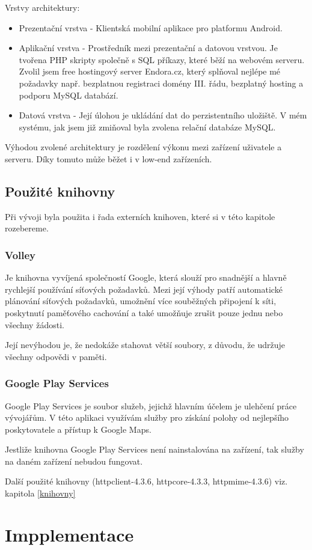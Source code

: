 \documentclass[12pt]{article}
\begin{document}
Vrstvy architektury:
\begin{itemize}
\item Prezentační vrstva - Klientská mobilní aplikace pro platformu Android.
\item Aplikační vrstva - Prostředník mezi prezentační a datovou vrstvou. Je tvořena PHP skripty společně s SQL příkazy, které běží na webovém serveru. Zvolil jsem free hostingový server Endora.cz, který splňoval nejlépe mé požadavky např. bezplatnou registraci domény III. řádu, bezplatný hosting a podporu MySQL databází.
\item Datová vrstva - Její úlohou je ukládání dat do perzistentního uložiště. V mém systému, jak jsem již zmiňoval byla zvolena relační databáze MySQL.
\end{itemize}
Výhodou zvolené architektury je rozdělení výkonu mezi zařízení uživatele a serveru. Díky tomuto může běžet i v low-end zařízeních.
\subsection{Použité knihovny}
Při vývoji byla použita i řada externích knihoven, které si v této kapitole rozebereme.
\subsubsection{Volley}
Je knihovna vyvíjená společností Google, která slouží pro snadnější a hlavně rychlejší používání síťových požadavků. Mezi její výhody patří automatické plánování síťových požadavků, umožnění více souběžných připojení k síti, poskytnutí paměťového cachování a také umožňuje zrušit pouze jednu nebo všechny žádosti.

Její nevýhodou je, že nedokáže stahovat větší soubory, z důvodu, že udržuje všechny odpovědi v paměti.\cite{volley}
\subsubsection{Google Play Services}
Google Play Services je soubor služeb, jejichž hlavním účelem je ulehčení práce vývojářům. V této aplikaci využívám služby pro získání polohy od nejlepšího poskytovatele a přístup k Google Maps.

Jestliže knihovna Google Play Services není nainstalována na zařízení, tak služby na daném zařízení nebudou fungovat.\cite{services}


Další použité knihovny (httpclient-4.3.6, httpcore-4.3.3, httpmime-4.3.6) viz. kapitola \ref{knihovny}
\section{Impplementace}
\end{document}
